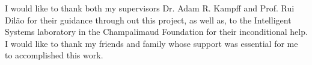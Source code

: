 \begin{acknowledgments} 
I would like to thank both my supervisors Dr. Adam R. Kampff and Prof. Rui Dilão for their guidance through out this project, as well as, to the Intelligent Systems laboratory in the Champalimaud Foundation for their inconditional help. I would like to thank my friends and family whose support was essential for me to accomplished this work.
\end{acknowledgments}
\clearpage
\thispagestyle{empty}
\cleardoublepage

